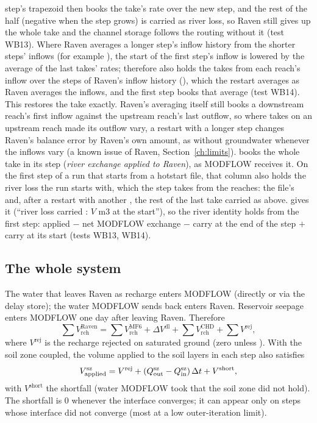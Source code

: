 step's trapezoid then books the take's rate over the new step, and the rest of the half (negative when the step grows)
is carried as river loss, so Raven still gives up the whole take and the channel storage follows the routing without
it (test WB13). Where Raven averages a longer step's inflow history from the shorter steps' inflows (for example
), the start of the first step's inflow is lowered by the average of the last takes' rates;
 therefore also holds the takes from each reach's inflow over the steps of Raven's inflow history
(), which the restart averages as Raven averages the inflows, and the first step books that
average (test WB14). This restores the take exactly. Raven's averaging itself still books a downstream reach's first
inflow against the upstream reach's last outflow, so where takes on an upstream reach made its outflow vary, a restart
with a longer step changes Raven's balance error by Raven's own amount, as without groundwater whenever the inflows vary
(a known issue of Raven, Section~\ref{ch:limits}).  books the whole take in its step (\emph{river
exchange applied to Raven}), as MODFLOW receives it. On the first step of a run that starts from a hotstart file, that
column also holds the river loss the run starts with, which the step takes from the reaches: the file's
 and, after a restart with another , the rest of the last take carried as above.
 gives it (``river loss carried : $V$ m3 at the start''), so the river identity holds from the
first step: applied $-$ net MODFLOW exchange $-$ carry at the end of the step $+$ carry at its start (tests WB13, WB14).

\subsection{The whole system}
The water that leaves Raven as recharge enters MODFLOW (directly or via the delay store); the water MODFLOW sends back
enters Raven. Reservoir seepage enters MODFLOW one day after leaving Raven. Therefore
\begin{equation}
\sum V^{\mathrm{Raven}}_{\mathrm{rch}}=\sum V^{\mathrm{MF6}}_{\mathrm{rch}}+\Delta V^{\mathrm{dl}}+\sum V^{\mathrm{CHD}}_{\mathrm{rch}}+\sum V^{\mathrm{rej}},
\end{equation}
where $V^{\mathrm{rej}}$ is the recharge rejected on saturated ground (zero unless ). With the soil
zone coupled, the volume applied to the soil layers in each step also satisfies
\begin{equation}
V^{\mathrm{sz}}_{\mathrm{applied}}=V^{\mathrm{rej}}+\left(Q^{\mathrm{sz}}_{\mathrm{out}}-Q^{\mathrm{sz}}_{\mathrm{in}}\right)\Delta t+V^{\mathrm{short}},
\end{equation}
with $V^{\mathrm{short}}$ the shortfall (water MODFLOW took that the soil zone did not hold). The shortfall is 0 whenever the
interface converges; it can appear only on steps whose interface did not converge (most at a low outer-iteration limit).

